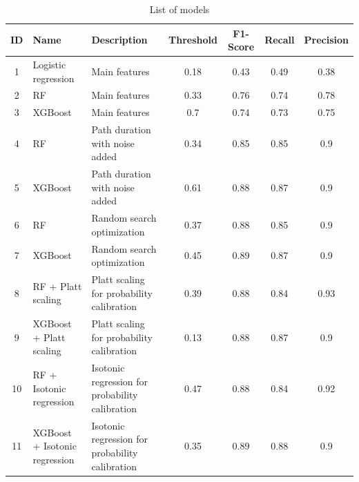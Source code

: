 \documentclass[12pt]{article}
\begin{document}
\newpage
\FloatBarrier
\begin{table}[ht]
\centering
\caption{List of models}
\label{tab:List of models}
\renewcommand{\arraystretch}{3}
\begin{small}
\begin{tabularx}{\textwidth}{|c|X|X|c|c|c|c|}
\hline
\textbf{ID} & \textbf{Name} & \textbf{Description} & \textbf{Threshold} & \textbf{F1-Score} & \textbf{Recall} & \textbf{Precision} \\ \hline
1 & Logistic regression & Main features & 0.18 & 0.43 & 0.49 & 0.38  \\ \hline
2 & RF & Main features & 0.33 & 0.76 & 0.74 & 0.78  \\ \hline
3 & XGBoost & Main features & 0.7 & 0.74 & 0.73 & 0.75 \\ \hline
4 & RF & Path duration with noise added & 0.34 & 0.85 & 0.85 & 0.9  \\ \hline
5 & XGBoost & Path duration with noise added & 0.61 & 0.88 & 0.87 & 0.9  \\ \hline
6 & RF & Random search optimization & 0.37 & 0.88 & 0.85 & 0.9  \\ \hline
7 & XGBoost & Random search optimization & 0.45 & 0.89 & 0.87 & 0.9  \\ \hline
8 & RF + Platt scaling & Platt scaling for probability calibration & 0.39 & 0.88 & 0.84 & 0.93 \\ \hline
9 & XGBoost + Platt scaling & Platt scaling for probability calibration & 0.13 & 0.88 & 0.87 & 0.9  \\ \hline
10 & RF + Isotonic regression & Isotonic regression for probability calibration & 0.47 & 0.88 & 0.84 & 0.92  \\ \hline
11 & XGBoost + Isotonic regression & Isotonic regression for probability calibration & 0.35 & 0.89 & 0.88 & 0.9 \\ \hline
\end{tabularx}
\end{small}
\end{table}
 
\FloatBarrier


\newpage
\end{document}
